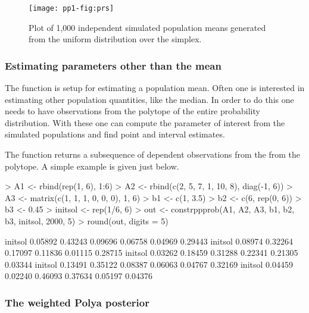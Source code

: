 \documentclass{article}
\begin{document}
\begin{figure}
\begin{center}
\texttt{[image: pp1-fig:prs]}
\end{center}
\caption{Plot of 1,000 independent simulated population means 
generated from  the uniform distribution over the simplex.}
\label{fig:prs}
\end{figure}

\subsubsection{Estimating parameters other than the mean}

The function \verb@constrppmn@ is setup for estimating 
a population mean. Often one is interested in estimating 
other population quantities, like the median. In order to 
do this one needs to have observations from the polytope 
of the entire probability distribution. With these one can 
compute the parameter of interest from the simulated 
populations and find point and interval estimates.

The function \verb@constrppprob@ returns a subsequence of 
 dependent observations from the from the polytope.
A simple example is given just below.

\begin{Schunk}
\begin{Sinput}
> A1 <- rbind(rep(1, 6), 1:6)
> A2 <- rbind(c(2, 5, 7, 1, 10, 8), diag(-1, 6))
> A3 <- matrix(c(1, 1, 1, 0, 0, 0), 1, 6)
> b1 <- c(1, 3.5)
> b2 <- c(6, rep(0, 6))
> b3 <- 0.45
> initsol <- rep(1/6, 6)
> out <- constrppprob(A1, A2, A3, b1, b2, b3, initsol, 2000, 5)
> round(out, digits = 5)
\end{Sinput}
\begin{Soutput}
           [,1]    [,2]    [,3]    [,4]    [,5]    [,6]
initsol 0.05892 0.43243 0.09696 0.06758 0.04969 0.29443
initsol 0.08974 0.32264 0.17097 0.11836 0.01115 0.28715
initsol 0.03262 0.18459 0.31288 0.22341 0.21305 0.03344
initsol 0.13491 0.35122 0.08387 0.06063 0.04767 0.32169
initsol 0.04459 0.02240 0.46093 0.37634 0.05197 0.04376
\end{Soutput}
\end{Schunk}

\subsubsection{The weighted Polya posterior}
\end{document}
